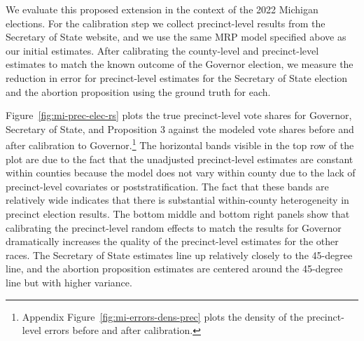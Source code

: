 We evaluate this proposed extension in the context of the 2022 Michigan elections.
For the calibration step we collect precinct-level results from the Secretary of State website, and we use the same MRP model specified above as our initial estimates.
After calibrating the county-level and precinct-level estimates to match the known outcome of the Governor election, we measure the reduction in error for precinct-level estimates for the Secretary of State election and the abortion proposition using the ground truth for each.

Figure~\ref{fig:mi-prec-elec-rs} plots the true precinct-level vote shares for Governor, Secretary of State, and Proposition 3 against the modeled vote shares before and after calibration to Governor.\footnote{Appendix Figure~\ref{fig:mi-errors-dens-prec} plots the density of the precinct-level errors before and after calibration.}
The horizontal bands visible in the top row of the plot are due to the fact that the unadjusted precinct-level estimates are constant within counties because the model does not vary within county due to the lack of precinct-level covariates or poststratification. 
The fact that these bands are relatively wide indicates that there is substantial within-county heterogeneity in precinct election results.
The bottom middle and bottom right panels show that calibrating the precinct-level random effects to match the results for Governor dramatically increases the quality of the precinct-level estimates for the other races. 
The Secretary of State estimates line up relatively closely to the 45-degree line, and the abortion proposition estimates are centered around the 45-degree line but with higher variance.

\begin{table}[tb]
	\centering
	\caption{Precinct-Level Errors,  Michigan 2022 Elections}
	\label{tab:mi-prec-error}
	
\end{table}

